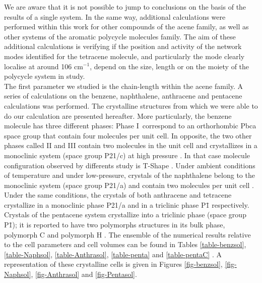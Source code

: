 
 We are aware that it is not possible to jump to conclusions on the basis of the results of a single system. In the same way, additional calculations were performed within this work for other compounds of the acene family, as well as other systems of the aromatic polycycle molecules family. The aim of these additional calculations is verifying if the position and activity of the network modes identified for the tetracene molecule, and particularly the mode clearly localise at around 106 cm$^{-1}$, depend on the size, length or on the moiety of the polycycle system in study.\\
 
 The first parameter we studied is the chain-length within the acene family. A series of calculations on the benzene, naphthalene, anthracene and pentacene calculations was performed. The crystalline structures from which we were able to do our calculation are presented hereafter. More particularly, the benzene molecule has three different phases: Phase I correspond to an orthorhombic Pbca space group that contain four molecules per unit cell. In opposite, the two other phases called II and III contain two molecules in the unit cell and crystallizes in a monoclinic system (space group P21/c) at high pressure \cite{meijer1996density,katrusiak2010association}. In that case molecule configuration observed by differents study is T-Shape \cite{katrusiak2010association}. Under ambient conditions of temperature and under low-pressure, crystals of the naphthalene belong to the monoclinic system (space group P21/a) and contain two molecules per unit cell \cite{fabbiani2006exploration}. Under the same conditions, the crystals of both anthracene and tetracene crystallize in a monoclinic phase P21/a \cite{brock1990temperature} and in a triclinic phase P\={1} \cite{sondermann1985x} respectively. Crystals of the pentacene system crystallize into a triclinic phase (space group P\={1}); it is reported to have two polymorphs structures in its bulk phase, polymorph C \cite{campbell1961crystal} and polymorph H \cite{mattheus2001polymorphism}. The ensemble of the numerical results relative to the cell parameters and cell volumes can be found in Tables \ref{table-benzsol}, \ref{table-Naphsol}, \ref{table-Anthrasol}, \ref{table-penta} and \ref{table-pentaC} . A representation of these crystalline cells is given in Figures \ref{fig-benzsol}, \ref{fig-Naphsol}, \ref{fig-Anthrasol} and  \ref{fig-Pentasol}.
 
